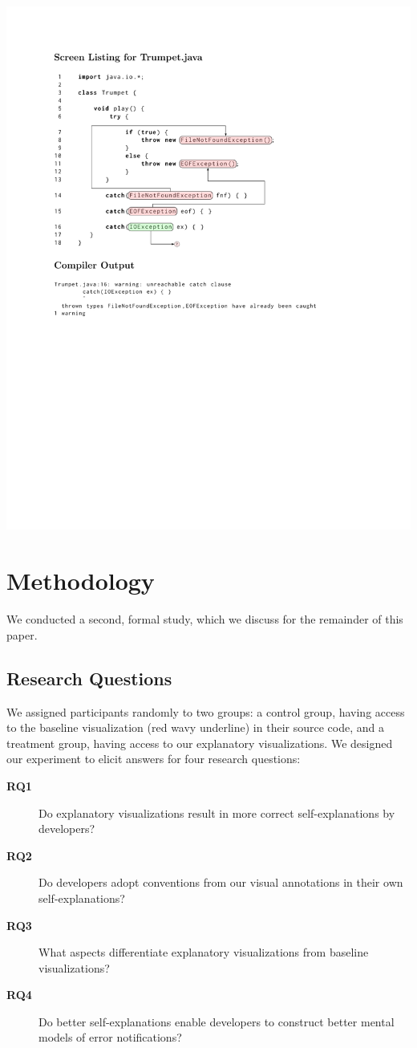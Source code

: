 \documentclass[conference]{IEEEtran}
\begin{document}
\includegraphics{trumpet_explain_crop.pdf}

\section{Methodology}

We conducted a second, formal study, which we discuss for the remainder of this paper.

\subsection{Research Questions}

We assigned participants randomly to two groups: a control group, having access to the baseline visualization (red wavy underline) in their source code, and a treatment group, having access to our explanatory visualizations. We designed our experiment to elicit answers for four research questions:

\begin{description}
\item[\textbf{RQ1}] Do explanatory visualizations result in more correct self-explanations by developers?
\item[\textbf{RQ2}] Do developers adopt conventions from our visual annotations in their own self-explanations?
\item[\textbf{RQ3}] What aspects differentiate explanatory visualizations from baseline visualizations?
\item[\textbf{RQ4}] Do better self-explanations enable developers to construct better mental models of error notifications?
\end{description}
\end{document}
